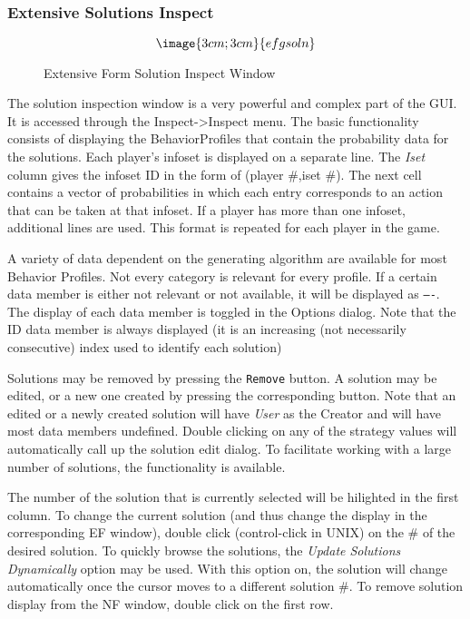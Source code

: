 \subsubsection{Extensive Solutions Inspect}\label{ExtensiveSolutionInspect}
\begin{figure}
$$\image{3cm;3cm}{efgsoln}$$
\caption{Extensive Form Solution Inspect Window}\label{fig_efgsoln}
\end{figure}

The solution inspection window is a very powerful and complex part of the GUI.
It is accessed through the Inspect->Inspect menu.
The basic functionality consists of displaying the BehaviorProfiles that contain the
probability data for the solutions.  Each player's infoset is displayed on a separate
line.  The {\em Iset} column gives the infoset ID in the form of (player \#,iset \#).
The next cell contains a vector of probabilities in which each entry corresponds to
an action that can be taken at that infoset.  If a player has more than one infoset,
additional lines are used.  This format is repeated for each player in the game.

A variety of data dependent on the generating algorithm are available for most
 Behavior Profiles. Not every category is relevant for every profile.  If a
certain data member is either not relevant or not available, it will be 
displayed as {\tt ----}.  The display of each data member is toggled in the
Options dialog.  Note that the ID data member is always displayed (it is
an increasing (not necessarily consecutive) index used to identify each
solution)

Solutions may be removed by pressing the {\tt Remove} button.  A solution may
be edited, or a new one created by pressing the corresponding button.  Note 
that an edited or a newly created solution will have {\em User} as the
Creator and will have most data members undefined.  Double clicking on any
of the strategy values will automatically call up the solution edit dialog.
To facilitate working with a large number of solutions, 
the  functionality is available.

The number of the solution that is currently selected will be hilighted in the first
column.  To change the current solution (and thus change the display in the 
corresponding EF window), double click (control-click in UNIX) on the \# of the
desired solution.  To quickly browse the solutions, the {\em Update Solutions Dynamically}
option may be used.  With this option on, the solution will change automatically once
the cursor moves to a different solution \#.  To remove solution display from the NF window,
double click on the first row.

